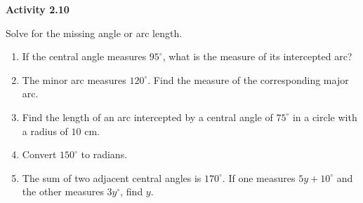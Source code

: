 \vspace{0.3ex}
\noindent\textbf{Activity 2.10}

\vspace{0.2ex}

Solve for the missing angle or arc length.

\begin{enumerate}
    \item If the central angle measures $95^\circ$, what is the measure of its intercepted arc?
    \item The minor arc measures $120^\circ$. Find the measure of the corresponding major arc.
    \item Find the length of an arc intercepted by a central angle of $75^\circ$ in a circle with a radius of $10$ cm.
    \item Convert $150^\circ$ to radians.
    \item The sum of two adjacent central angles is $170^\circ$. If one measures $5y + 10^\circ$ and the other measures $3y^\circ$, find $y$.
\end{enumerate}
